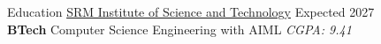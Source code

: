 \documentclass{resume} %
\begin{document}















\begin{rSection}{Education}
    \href{https://www.linkedin.com/school/s.r.m.-institute-of-science-&-technology-chennai/}{SRM Institute of Science and Technology} \hfill Expected 2027\\
\textbf{BTech} Computer Science Engineering with AIML \hfill \textit{CGPA: 9.41}
\end{rSection}
\end{document}
